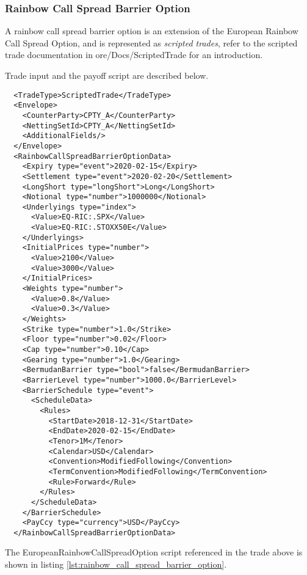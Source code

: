 \subsubsection*{Rainbow Call Spread Barrier Option}

A rainbow call spread barrier option is an extension of the European Rainbow Call Spread Option, and is
represented as {\em scripted trades}, refer to the scripted trade documentation in ore/Docs/ScriptedTrade
for an introduction.

Trade input and the payoff script are described below.

\begin{verbatim}
  <TradeType>ScriptedTrade</TradeType>
  <Envelope>
    <CounterParty>CPTY_A</CounterParty>
    <NettingSetId>CPTY_A</NettingSetId>
    <AdditionalFields/>
  </Envelope>
  <RainbowCallSpreadBarrierOptionData>
    <Expiry type="event">2020-02-15</Expiry>
    <Settlement type="event">2020-02-20</Settlement>
    <LongShort type="longShort">Long</LongShort>
    <Notional type="number">1000000</Notional>
    <Underlyings type="index">
      <Value>EQ-RIC:.SPX</Value>
      <Value>EQ-RIC:.STOXX50E</Value>
    </Underlyings>
    <InitialPrices type="number">
      <Value>2100</Value>
      <Value>3000</Value>
    </InitialPrices>
    <Weights type="number">
      <Value>0.8</Value>
      <Value>0.3</Value>
    </Weights>
    <Strike type="number">1.0</Strike>
    <Floor type="number">0.02</Floor>
    <Cap type="number">0.10</Cap>
    <Gearing type="number">1.0</Gearing>
    <BermudanBarrier type="bool">false</BermudanBarrier>
    <BarrierLevel type="number">1000.0</BarrierLevel>
    <BarrierSchedule type="event">
      <ScheduleData>
        <Rules>
          <StartDate>2018-12-31</StartDate>
          <EndDate>2020-02-15</EndDate>
          <Tenor>1M</Tenor>
          <Calendar>USD</Calendar>
          <Convention>ModifiedFollowing</Convention>
          <TermConvention>ModifiedFollowing</TermConvention>
          <Rule>Forward</Rule>
        </Rules>
      </ScheduleData>
    </BarrierSchedule>
    <PayCcy type="currency">USD</PayCcy>
  </RainbowCallSpreadBarrierOptionData>
\end{verbatim}

The EuropeanRainbowCallSpreadOption script referenced in the trade above is shown in listing
\ref{lst:rainbow_call_spread_barrier_option}.


